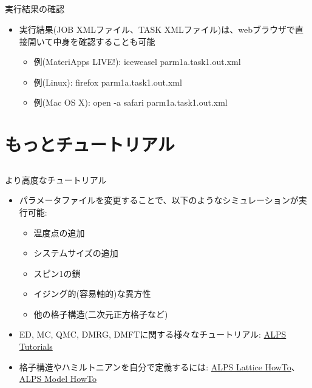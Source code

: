 \subsection*{\redm\whitem\greenb}
\begin{frame}[t,fragile]{実行結果の確認}
  \begin{itemize}
    \item 実行結果(JOB XMLファイル、TASK XMLファイル)は、webブラウザで直接開いて中身を確認することも可能
      \begin{itemize}
      \item 例(MateriApps LIVE!): iceweasel parm1a.task1.out.xml
      \item 例(Linux): firefox parm1a.task1.out.xml
      \item 例(Mac OS X): open -a safari parm1a.task1.out.xml
      \end{itemize}
  \end{itemize}
\end{frame}

\section{もっとチュートリアル}

\subsection*{\redm\whiteb\greenb}
\begin{frame}[t,fragile]{より高度なチュートリアル}
  \begin{itemize}
  \item パラメータファイルを変更することで、以下のようなシミュレーションが実行可能:
    \begin{itemize}
    \item 温度点の追加
    \item システムサイズの追加
    \item スピン1の鎖
    \item イジング的(容易軸的)な異方性
    \item 他の格子構造(二次元正方格子など)
    \end{itemize}
  \item ED, MC, QMC, DMRG, DMFTに関する様々なチュートリアル: \href{http://alps.comp-phys.org/mediawiki/index.php/ALPS_2_Tutorials:Overview}{ALPS Tutorials}
  \item 格子構造やハミルトニアンを自分で定義するには: \href{http://alps.comp-phys.org/mediawiki/index.php/Tutorials:LatticeHOWTO}{ALPS Lattice HowTo}、\href{http://alps.comp-phys.org/mediawiki/index.php/Tutorials:ModelHOWTO}{ALPS Model HowTo}
  \end{itemize}
\end{frame}

